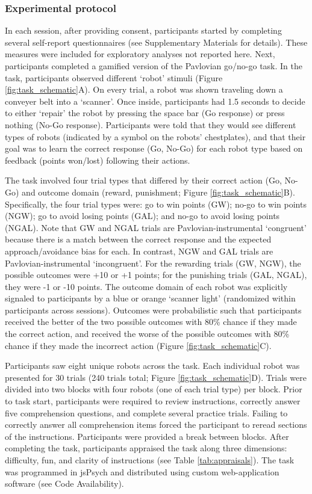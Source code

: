 \documentclass[a4paper,12pt]{article}
\begin{document}
\begin{refsection}[main]
\subsubsection*{Experimental protocol}

In each session, after providing consent, participants started by completing several self-report questionnaires (see Supplementary Materials for details). These measures were included for exploratory analyses not reported here. Next, participants completed a gamified version of the Pavlovian go/no-go task. In the task, participants observed different `robot' stimuli (Figure \ref{fig:task_schematic}A). On every trial, a robot was shown traveling down a conveyer belt into a `scanner'. Once inside, participants had 1.5 seconds to decide to either `repair' the robot by pressing the space bar (Go response) or press nothing (No-Go response). Participants were told that they would see different types of robots (indicated by a symbol on the robots' chestplates), and that their goal was to learn the correct response (Go, No-Go) for each robot type based on feedback (points won/lost) following their actions.

The task involved four trial types that differed by their correct action (Go, No-Go) and outcome domain (reward, punishment; Figure \ref{fig:task_schematic}B). Specifically, the four trial types were: go to win points (GW); no-go to win points (NGW); go to avoid losing points (GAL); and no-go to avoid losing points (NGAL). Note that GW and NGAL trials are Pavlovian-instrumental `congruent' because there is a match between the correct response and the expected approach/avoidance bias for each. In contrast, NGW and GAL trials are Pavlovian-instrumental `incongruent'. For the rewarding trials (GW, NGW), the possible outcomes were +10 or +1 points; for the punishing trials (GAL, NGAL), they were -1 or -10 points. The outcome domain of each robot was explicitly signaled to participants by a blue or orange `scanner light' (randomized within participants across sessions). Outcomes were probabilistic such that participants received the better of the two possible outcomes with 80\% chance if they made the correct action, and received the worse of the possible outcomes with 80\% chance if they made the incorrect action (Figure \ref{fig:task_schematic}C).

Participants saw eight unique robots across the task. Each individual robot was presented for 30 trials (240 trials total; Figure \ref{fig:task_schematic}D). Trials were divided into two blocks with four robots (one of each trial type) per block. Prior to task start, participants were required to review instructions, correctly answer five comprehension questions, and complete several practice trials. Failing to correctly answer all comprehension items forced the participant to reread sections of the instructions. Participants were provided a break between blocks. After completing the task, participants appraised the task along three dimensions: difficulty, fun, and clarity of instructions (see Table \ref{tab:appraisals}). The task was programmed in jsPsych \cite{de2015jspsych} and distributed using custom web-application software (see Code Availability). 


\end{refsection}
\end{document}
